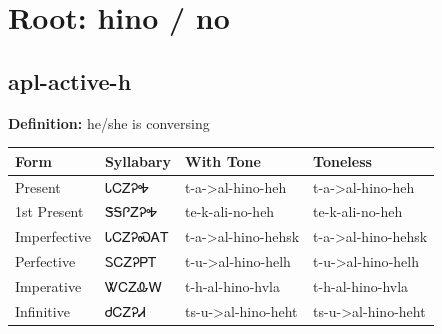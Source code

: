 \documentclass{article}%
\begin{document}
%
\normalsize%
\section*{Root: hino / no}%
\subsection*{apl-active-h}%
\textbf{Definition: }%
he/she is conversing%
\\[0.5em]%
\begin{tabular}{|l|l|l|l|}%
\hline%
\textbf{Form}&\textbf{Syllabary}&\textbf{With Tone}&\textbf{Toneless}\\%
\hline%
Present&ᏓᏟᏃᎮᎭ&t{-}a{-}>al{-}hino{-}heh&t{-}a{-}>al{-}hino{-}heh\\%
1st Present&ᏕᎦᎵᏃᎮᎭ&te{-}k{-}ali{-}no{-}heh&te{-}k{-}ali{-}no{-}heh\\%
Imperfective&ᏓᏟᏃᎮᏍᎪᎢ&t{-}a{-}>al{-}hino{-}hehsk&t{-}a{-}>al{-}hino{-}hehsk\\%
Perfective&ᏚᏟᏃᎮᏢᎢ&t{-}u{-}>al{-}hino{-}helh&t{-}u{-}>al{-}hino{-}helh\\%
Imperative&ᏔᏟᏃᎲᎳ&t{-}h{-}al{-}hino{-}hvla&t{-}h{-}al{-}hino{-}hvla\\%
Infinitive&ᏧᏟᏃᎮᏗ&ts{-}u{-}>al{-}hino{-}heht&ts{-}u{-}>al{-}hino{-}heht\\%
\hline%
\end{tabular}%
\\[1em]%
\end{document}
